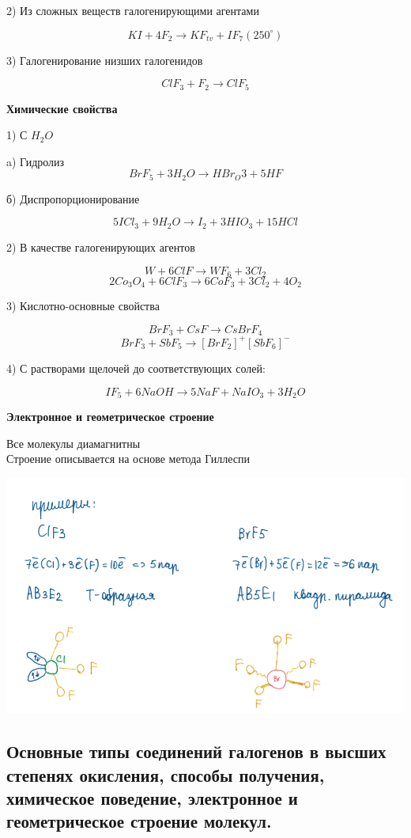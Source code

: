 \documentclass[14pt,a4paper]{scrartcl}
\begin{document}
2) Из сложных веществ галогенирующими агентами

$$KI + 4F_2 \rightarrow KF_{tv} + IF_7 (250^{\circ})$$

3) Галогенирование низших галогенидов

$$ClF_3 + F_2 \rightarrow ClF_5$$

\textbf{Химические свойства}

1) С $H_2O$

a) Гидролиз
$$BrF_5 + 3H_2O \rightarrow HBr_O3 + 5HF$$

б) Диспропорционирование

$$5ICl_3 + 9H_2O \rightarrow I_2 + 3HIO_3 + 15HCl$$

2) В качестве галогенирующих агентов

$$W + 6ClF \rightarrow WF_6 + 3Cl_2$$
$$2Co_3O_4 + 6ClF_3 \rightarrow 6CoF_3 + 3Cl_2 + 4O_2$$

3) Кислотно-основные свойства

$$BrF_3 + CsF \rightarrow CsBrF_4$$
$$BrF_3 + SbF_5 \rightarrow [BrF_2]^+[SbF_6]^-$$

4) С растворами щелочей до соответствующих солей: 

$$IF_5 + 6NaOH \rightarrow 5NaF + NaIO_3 + 3H_2O$$

\textbf{Электронное и геометрическое строение}

Все молекулы диамагнитны\\
Строение описывается на основе метода Гиллеспи

\includegraphics{4v2.png}

\subsection{Основные типы соединений галогенов в высших степенях окисления, способы получения, химическое поведение, электронное и геометрическое строение молекул.}
\end{document}
